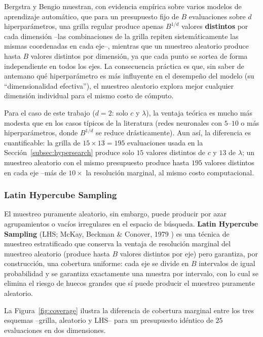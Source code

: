 \documentclass[11pt,a4paper]{article}
\begin{document}
Bergstra y Bengio \cite{bergstra2012} muestran, con evidencia emp\'irica sobre
varios modelos de aprendizaje autom\'atico, que para un presupuesto fijo de
$B$ evaluaciones sobre $d$ hiperpar\'ametros, una grilla regular produce
apenas $B^{1/d}$ valores \textbf{distintos} por cada dimensi\'on --las
combinaciones de la grilla repiten sistem\'aticamente las mismas coordenadas
en cada eje--, mientras que un muestreo aleatorio produce hasta $B$ valores
distintos por dimensi\'on, ya que cada punto se sortea de forma independiente
en todos los ejes. La consecuencia pr\'actica es que, sin saber de antemano
qu\'e hiperpar\'ametro es m\'as influyente en el desempe\~no del modelo (su
``dimensionalidad efectiva''), el muestreo aleatorio explora mejor cualquier
dimensi\'on individual para el mismo costo de c\'omputo.

Para el caso de este trabajo ($d=2$: solo $c$ y $\lambda$), la ventaja te\'orica
es mucho m\'as modesta que en los casos t\'ipicos de la literatura (redes
neuronales con $5$--$10$ o m\'as hiperpar\'ametros, donde $B^{1/d}$ se
reduce dr\'asticamente). Aun as\'i, la diferencia es cuantificable: la grilla
de $15\times13=195$ evaluaciones usada en la Secci\'on~\ref{subsec:hypersearch}
produce solo $15$ valores distintos de $c$ y $13$ de $\lambda$; un muestreo
aleatorio con el mismo presupuesto produce hasta $195$ valores distintos en
cada eje --m\'as de $10\times$ la resoluci\'on marginal, al mismo costo
computacional.

\subsubsection{Latin Hypercube Sampling}

El muestreo puramente aleatorio, sin embargo, puede producir por azar
agrupamientos o vac\'ios irregulares en el espacio de b\'usqueda. \textbf{Latin
Hypercube Sampling} (LHS; McKay, Beckman \& Conover, 1979 \cite{mckay1979})
es una t\'ecnica de muestreo estratificado que conserva la ventaja de
resoluci\'on marginal del muestreo aleatorio (produce hasta $B$ valores
distintos por eje) pero garantiza, por construcci\'on, una cobertura uniforme:
cada eje se divide en $B$ intervalos de igual probabilidad y se garantiza
exactamente una muestra por intervalo, con lo cual se elimina el riesgo de
huecos grandes que s\'i puede producir el muestreo puramente aleatorio.

La Figura~\ref{fig:coverage} ilustra la diferencia de cobertura marginal entre
los tres esquemas --grilla, aleatorio y LHS-- para un presupuesto id\'entico de
$25$ evaluaciones en dos dimensiones.
\end{document}
